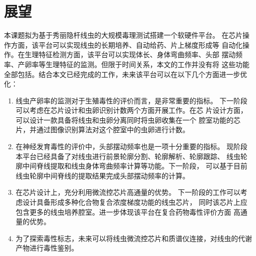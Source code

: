 \section{展望}
	本课题拟为基于秀丽隐杆线虫的大规模毒理测试搭建一个软硬件平台。
	在芯片操作方面，该平台可以实现线虫的长期培养、自动给药、片上梯度形成等
	自动化操作。在生理特征检测方面，该平台可以实现体长、身体弯曲频率、头部
	摆动频率、产卵率等生理特征的监测。但限于时间关系，本文的工作并没有将
	这些功能全部包括。结合本文已经完成的工作，未来该平台可以在以下几个方面进一步优化：
	
	\begin{enumerate}[label={(\arabic*)},font={\color{black!50!black}\bfseries}]
	\item 线虫产卵率的监测对于生殖毒性的评价而言，是非常重要的指标。
	下一阶段可以考虑在芯片设计和虫卵识别计数两个方面开展工作。在芯
	片设计方面，可以设计一款具备将线虫和虫卵分离同时将虫卵收集在一个
	腔室功能的芯片，并通过图像识别算法对这个腔室中的虫卵进行计数。
	\item 在神经发育毒性的评价中，头部摆动频率也是一项十分重要的指标。
	现阶段本平台已经具备了对线虫进行前景轮廓分割、轮廓解析、轮廓跟踪、
	线虫轮廓中间脊线提取和线虫身体弯曲频率计算等功能。下一阶段，
	可以基于目前线虫轮廓中间脊线的提取结果完成头部摆动频率的计算。
	\item 在芯片设计上，充分利用微流控芯片高通量的优势。
	下一阶段的工作可以考虑设计具备形成多种化合物复合浓度梯度功能的线虫芯片，
	同时该芯片上应包含更多的线虫培养腔室。进一步体现该平台在复合药物毒性评价方面
	高通量的优势。
	\item 为了探索毒性标志，未来可以将线虫微流控芯片和质谱仪连接，对线虫的代谢产物进行毒性鉴别。

	\end{enumerate}








